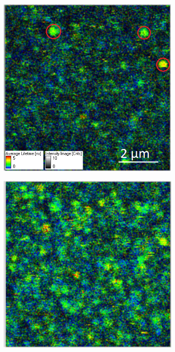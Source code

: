 \documentclass[twoside,single]{lion-msc}
\begin{document}
\begin{figure}
\begin{subfigure}{.5\textwidth}
  \centering
  \includegraphics[width=.95 \linewidth]{voorbeeld_protein_2}
  \label{}
\end{subfigure}%
\begin{subfigure}{.5\textwidth}
  \centering
  \includegraphics[width=.95 \linewidth]{voorbeeld_protein_1}

\end{subfigure}
\end{figure}
\end{document}
